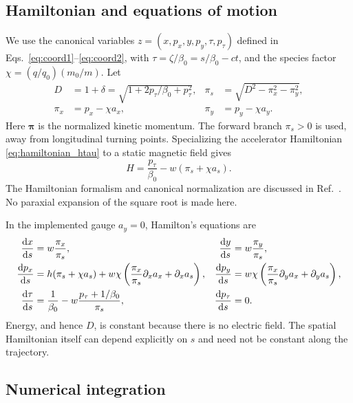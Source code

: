 \subsection{Hamiltonian and equations of motion}

We use the canonical variables \(z=(x,p_x,y,p_y,\tau,p_\tau)\) defined in
Eqs.~\eqref{eq:coord1}--\eqref{eq:coord2}, with
\(\tau=\zeta/\beta_0=s/\beta_0-ct\), and the species factor
\(\chi=(q/q_0)(m_0/m)\). Let
\begin{equation}
 \begin{aligned}
 D&=1+\delta=\sqrt{1+2p_\tau/\beta_0+p_\tau^2}, &
 \pi_s&=\sqrt{D^2-\pi_x^2-\pi_y^2},\\
 \pi_x&=p_x-\chi a_x, & \pi_y&=p_y-\chi a_y.
 \end{aligned}
 \label{bfe:kinetic-momentum}
\end{equation}
Here \(\bm\pi\) is the normalized kinetic momentum. The forward branch
\(\pi_s>0\) is used, away from longitudinal turning points.
Specializing the accelerator Hamiltonian
\eqref{eq:hamiltonian_htau} to a static magnetic field gives
\begin{equation}
 H=\frac{p_\tau}{\beta_0}-w(\pi_s+\chi a_s).
 \label{bfe:hamiltonian}
\end{equation}
The Hamiltonian formalism and canonical normalization are discussed in
Ref.~\cite{wolski2014beam}. No paraxial expansion of the square root is
made here.

In the implemented gauge \(a_y=0\), Hamilton's equations are
\begin{align}
 \frac{\text{d} x}{\text{d} s}&=w\frac{\pi_x}{\pi_s}, &
 \frac{\text{d} y}{\text{d} s}&=w\frac{\pi_y}{\pi_s},\\
 \frac{\text{d} p_x}{\text{d} s}&=h(\pi_s+\chi a_s)
   +w\chi\left(\frac{\pi_x}{\pi_s}\partial_x a_x+\partial_x a_s\right), &
 \frac{\text{d} p_y}{\text{d} s}&=w\chi\left(
       \frac{\pi_x}{\pi_s}\partial_y a_x+\partial_y a_s\right),\\
 \frac{\text{d}\tau}{\text{d} s}&=\frac{1}{\beta_0}
                -w\frac{p_\tau+1/\beta_0}{\pi_s}, &
 \frac{\text{d} p_\tau}{\text{d} s}&=0.
 \label{bfe:equations}
\end{align}
Energy, and hence \(D\), is constant because there is no electric field.
The spatial Hamiltonian itself can depend explicitly on \(s\) and need
not be constant along the trajectory.

\subsection{Numerical integration}

